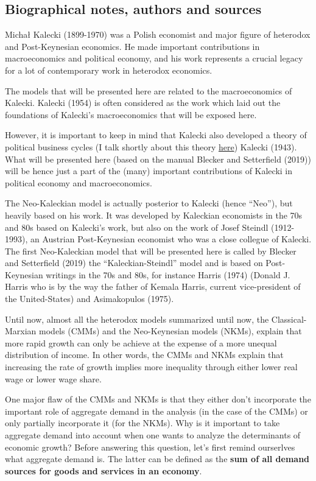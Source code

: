 \documentclass[
  letterpaper,
  DIV=11,
  numbers=noendperiod]{scrreprt}
\begin{document}
\hypertarget{biographical-notes-authors-and-sources}{%
\subsection{Biographical notes, authors and
sources}\label{biographical-notes-authors-and-sources}}

Michał Kalecki (1899-1970) was a Polish economist and major figure of
heterodox and Post-Keynesian economics. He made important contributions
in macroeconomics and political economy, and his work represents a
crucial legacy for a lot of contemporary work in heterodox economics.

The models that will be presented here are related to the macroeconomics
of Kalecki. Kalecki (1954) is often considered as the work which laid
out the foundations of Kalecki's macroeconomics that will be exposed
here.

However, it is important to keep in mind that Kalecki also developed a
theory of political business cycles (I talk shortly about this theory
\href{https://jeylal.github.io/myblog/posts/About\%20cycles\%20and\%20crises/cycles_crises.html}{here})
Kalecki (1943). What will be presented here (based on the manual Blecker
and Setterfield (2019)) will be hence just a part of the (many)
important contributions of Kalecki in political economy and
macroeconomics.

The Neo-Kaleckian model is actually posterior to Kalecki (hence
``Neo''), but heavily based on his work. It was developed by Kaleckian
economists in the 70s and 80s based on Kalecki's work, but also on the
work of Josef Steindl (1912-1993), an Austrian Post-Keynesian economist
who was a close collegue of Kalecki. The first Neo-Kaleckian model that
will be presented here is called by Blecker and Setterfield (2019) the
``Kaleckian-Steindl'' model and is based on Post-Keynesian writings in
the 70s and 80s, for instance Harris (1974) (Donald J. Harris who is by
the way the father of Kemala Harris, current vice-president of the
United-States) and Asimakopulos (1975).

Until now, almost all the heterodox models summarized until now, the
Classical-Marxian models (CMMs) and the Neo-Keynesian models (NKMs),
explain that more rapid growth can only be achieve at the expense of a
more unequal distribution of income. In other words, the CMMs and NKMs
explain that increasing the rate of growth implies more inequality
through either lower real wage or lower wage share.

One major flaw of the CMMs and NKMs is that they either don't
incorporate the important role of aggregate demand in the analysis (in
the case of the CMMs) or only partially incorporate it (for the NKMs).
Why is it important to take aggregate demand into account when one wants
to analyze the determinants of economic growth? Before answering this
question, let's first remind ourserlves what aggregate demand is. The
latter can be defined as the \textbf{sum of all demand sources for goods
and services in an economy}.
\end{document}
